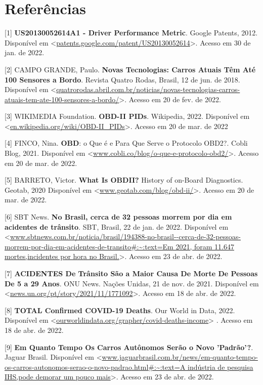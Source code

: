 \chapter{Referências}


[1] \textbf{US20130052614A1 - Driver Performance Metric}. Google Patents, 2012. Disponível em <\url{patents.google.com/patent/US20130052614}>. Acesso em 30 de jan. de 2022.

[2] CAMPO GRANDE, Paulo. \textbf{Novas Tecnologias: Carros Atuais Têm Até 100 Sensores a Bordo}. Revista Quatro Rodas, Brasil, 12 de jun. de 2018. Disponível em <\url{quatrorodas.abril.com.br/noticias/novas-tecnologias-carros-atuais-tem-ate-100-sensores-a-bordo/}>. Acesso em 20 de fev. de 2022.

[3] WIKIMEDIA Foundation. \textbf{OBD-II PIDs}. Wikipedia, 2022. Disponível em <\url{en.wikipedia.org/wiki/OBD-II_PIDs}>. Acesso em 20 de mar. de 2022

[4] FINCO, Nina. \textbf{OBD}: o Que é e Para Que Serve o Protocolo OBD2?. Cobli Blog, 2021. Disponível em <\url{www.cobli.co/blog/o-que-e-protocolo-obd2/}>. Acesso em 20 de mar. de 2022.

[5] BARRETO, Victor. \textbf{What Is OBDII?} History of on-Board Diagnostics. Geotab, 2020 Disponível em <\url{www.geotab.com/blog/obd-ii/}>. Acesso em 20 de mar. de 2022.

[6] SBT News. \textbf{No Brasil, cerca de 32 pessoas morrem por dia em acidentes de trânsito}. SBT, Brasil, 22 de jan. de 2022. Disponível em <\url{www.sbtnews.com.br/noticia/brasil/194388-no-brasil--cerca-de-32-pessoas-morrem-por-dia-em-acidentes-de-transito#:~:text=Em 2021, foram 11.647 mortes,incidentes por hora no Brasil.}>. Acesso em 23 de abr. de 2022.

[7] \textbf{ACIDENTES De Trânsito São a Maior Causa De Morte De Pessoas De 5 a 29 Anos}. ONU News. Nações Unidas, 21 de nov. de 2021. Disponível em <\url{news.un.org/pt/story/2021/11/1771092}>. Acesso em 18 de abr. de 2022.

[8] \textbf{TOTAL Confirmed COVID-19 Deaths}. Our World in Data, 2022. Disponível em <\url{ourworldindata.org/grapher/covid-deaths-income}>
. Acesso em 18 de abr. de 2022.

[9] \textbf{Em Quanto Tempo Os Carros Autônomos Serão o Novo 'Padrão'?}. Jaguar Brasil. Disponível em <\url{www.jaguarbrasil.com.br/news/em-quanto-tempo-os-carros-autonomos-serao-o-novo-padrao.html#:~:text=A indústria de pesquisa IHS,pode demorar um pouco mais}>. Acesso em 23 de abr. de 2022.


